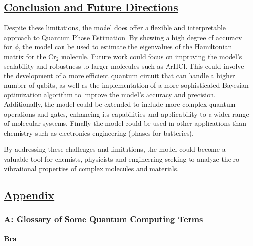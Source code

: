 \documentclass[
]{article}
\begin{document}
\subsection*{\texorpdfstring{\underline{Conclusion and Future Directions}}{}}\label{section-7}

Despite these limitations, the model does offer a flexible and
interpretable approach to Quantum Phase Estimation. By showing a high
degree of accuracy for \(\phi\), the model can be used to estimate the
eigenvalues of the Hamiltonian matrix for the Cr\(_2\) molecule. Future
work could focus on improving the model's scalability and robustness to
larger molecules such as ArHCl. This could involve the development of a
more efficient quantum circuit that can handle a higher number of
qubits, as well as the implementation of a more sophisticated Bayesian
optimization algorithm to improve the model's accuracy and precision.
Additionally, the model could be extended to include more complex
quantum operations and gates, enhancing its capabilities and
applicability to a wider range of molecular systems. Finally the model
could be used in other applications than chemistry such as electronics
engineering (phases for batteries).

By addressing these challenges and limitations, the model could become a
valuable tool for chemists, physicists and engineering seeking to
analyze the ro-vibrational properties of complex molecules and
materials.




\subsection*{\texorpdfstring{\underline{Appendix}}{}}\label{section-8}

\subsubsection*{\texorpdfstring{\underline{A: Glossary of Some Quantum Computing Terms}}{}}\label{section-9}

\paragraph*{\texorpdfstring{\underline{Bra}}{}}\label{section-10}
\end{document}
